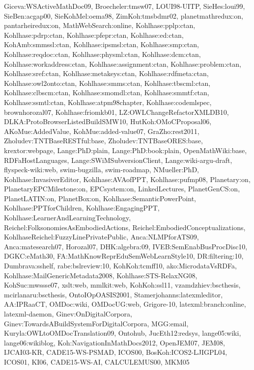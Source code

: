 {Giceva:WSActiveMathDoc09,%
Broecheler:tmsw07,%
LOUI98-UITP,%
SieHes:loui99,%
SieBen:acgap00,%
SieKohMel:oema98,%
ZimKoh:tmsbdmr02,%
planetmathredux:on,%
pantarheiredux:on,%
MathWebSearch:online,%
Kohlhase:pplp:ctan,%
Kohlhase:pdrp:ctan,%
Kohlhase:pfepr:ctan,%
Kohlhase:ed:ctan,%
KohAmb:smmssl:ctan,%
Kohlhase:ipsmsl:ctan,%
Kohlhase:smp:ctan,%
Kohlhase:reqdoc:ctan,%
Kohlhase:physml:ctan,%
Kohlhase:dcm:ctan,%
Kohlhase:workaddress:ctan,%
Kohlhase:assignment:ctan,%
Kohlhase:problem:ctan,%
Kohlhase:sref:ctan,%
Kohlhase:metakeys:ctan,%
Kohlhase:rdfmeta:ctan,%
Kohlhase:owl2onto:ctan,%
Kohlhase:smms:ctan,%
Kohlhase:tbscml:ctan,%
Kohlhase:clbscm:ctan,%
Kohlhase:smomdl:ctan,%
Kohlhase:smmtf:ctan,%
Kohlhase:ssmtl:ctan,%
Kohlhase:atpm98chapter,%
Kohlhase:codemlspec,%
brownhorozal07,%
Kohlhase:friomkb01,%
LZ:OWLChangeRefactorXMLDB10,%
DLKA:ProtoBrowserListedBuildSMW10,%
HutKoh:OMoCProposal06,%
AKoMue:AddedValue,%
KohMue:added-value07,%
GraZho:rest2011,%
Zholudev:TNTBaseRESTful:base,%
Zholudev:TNTBaseORES:base,%
krextor:webpage,%
Lange:PhD:plain,%
Lange:PhD:book:plain,%
OpenMathWiki:base,%
RDFaHostLanguages,%
Lange:SWiMSubversionClient,%
Lange:wiki-argu-draft,%
flyspeck-wiki:web,%
swim-bugzilla,%
swim-roadmap,%
NMueller:PhD,%
Kohlhase:InvasiverEditor,%
Kohlhase:AVAofPPT,%
Kohlhase:pufmp08,%
Planetary:on,%
PlanetaryEPCMilestone:on,%
EPCsystem:on,%
LinkedLectures,%
PlanetGenCS:on,%
PlanetLATIN:on,%
PlanetBox:on,%
Kohlhase:SemanticPowerPoint,%
Kohlhase:PPTforChildren,%
Kohlhase:EngagingPPT,%
Kohlhase:LearnerAndLearningTechnology,%
Reichel:FolksonomiesAsEmbodiedActions,%
Reichel:EmbodiedConceptualizations,%
KohlhaseReichel:FuzzyLinePrivatePublic,%
Anca:NLMPforATS09,%
Anca:matesearch07,%
Horozal07,%
DHK:algebra:09,%
IVEB:SemEnabBusProcDisc10,%
DGKC:eMath30,%
FA:MathKnowReprEduSemWebLearnStyle10,%
DR:filtering:10,%
Dumbrava:sshelf,%
rabe:bslreview:10,%
KohKoh:tcmff10,%
ako:MicrodataVsRDFa,%
Kohlhase:MailGenericMetadata2008,%
Kohlhase:STS-RelaxNG08,%
KohSuc:mwssse07,%
xslt:web,%
mmlkit:web,%
KohKoh:ssl11,%
vzamdzhiev:bscthesis,%
mcirlanaru:bscthesis,%
OntoIOpOASIS2001,%
Stamerjohanns:latexmleditor,%
AA:IPRaaCT,%
OMDoc:wiki,%
OMDocUG:web,%
Grigore-10,%
latexml:branch:online,%
latexml-daemon,%
Ginev:OnDigitalCorpora,%
Ginev:TowardsABuildSystemForDigitalCorpora,%
MGG:email,%
Kuryla:OWLtoOMDocTranslation09,%
Ontohub,%
JucEth12:redsys,%
lange05:wiki,%
lange06:wikiblog,%
Koh:NavigationInMathDocs2012,%
OpenJEM07,%
JEM08,%
IJCAI03-KR,%
CADE15-WS-PSMAD,%
ICOS00,%
BosKoh:ICOS2-LJIGPL04,%
ICOS01,%
KI06,%
CADE15-WS-AI,%
CALCULEMUS00,%
MKM05%
}
